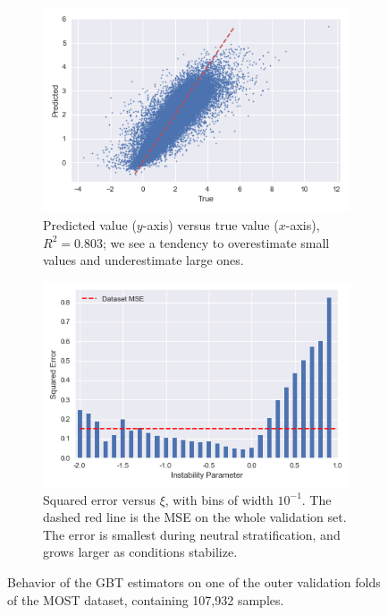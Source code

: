 \documentclass[a4paper,11pt]{kth-mag}
\begin{document}
\begin{figure}
    \centering
    \begin{subfigure}[t]{0.49\textwidth}
        \centering
        \includegraphics[width=\textwidth]{images/residuals_scatter}
        \caption{Predicted value ($y$-axis) versus true value ($x$-axis), $R^2=0.803$; we see a tendency to overestimate small values and underestimate large ones.}
        \label{fig:residuals_scatter}
    \end{subfigure}
    \hfill
    \begin{subfigure}[t]{0.49\textwidth}
        \centering
        \includegraphics[width=\textwidth]{images/error_by_xi}
        \caption{Squared error versus $\xi$, with bins of width $10^{-1}$. The dashed red line is the MSE on the whole validation set. The error is smallest during neutral stratification, and grows larger as conditions stabilize.}
        \label{fig:error_by_wind}
    \end{subfigure}
    \caption{Behavior of the GBT estimators on one of the outer validation folds of the MOST dataset, containing 107,932 samples. }
	\label{fig:predictions}
\end{figure}
\end{document}
